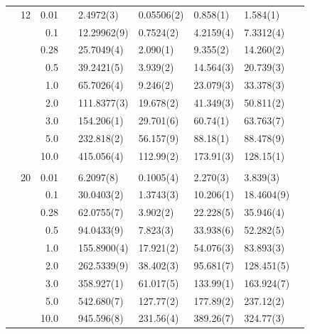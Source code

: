 \begin{table}[H]
\begin{tabularx}{\textwidth}{R{1cm}rrcR{2.3cm}R{2.3cm}R{2.3cm}R{2.3cm}R{1cm}}
		&12 & 0.01 && 2.4972(3) & 0.05506(2) & 0.858(1) & 1.584(1)\\
		&& 0.1 && 12.29962(9) & 0.7524(2) & 4.2159(4) & 7.3312(4) \\
		&& 0.28 && 25.7049(4) & 2.090(1) & 9.355(2) & 14.260(2) \\
		&& 0.5 && 39.2421(5) & 3.939(2) & 14.564(3) & 20.739(3) \\
		&& 1.0 && 65.7026(4) & 9.246(2) & 23.079(3) & 33.378(3) \\
		&& 2.0 && 111.8377(3) & 19.678(2) & 41.349(3) & 50.811(2) \\
		&& 3.0 && 154.206(1) & 29.701(6) & 60.74(1) & 63.763(7) \\ 
		&& 5.0 && 232.818(2) & 56.157(9) & 88.18(1) & 88.478(9) \\
		&& 10.0 && 415.056(4) & 112.99(2) & 173.91(3) & 128.15(1) \\
		\hdashline \\
		
		&20 & 0.01 && 6.2097(8) & 0.1005(4) & 2.270(3) & 3.839(3) \\
		&& 0.1 && 30.0403(2) & 1.3743(3) & 10.206(1) & 18.4604(9) \\
		&& 0.28 && 62.0755(7) & 3.902(2) & 22.228(5) & 35.946(4) \\
		&& 0.5 && 94.0433(9) & 7.823(3) & 33.938(6) & 52.282(5) \\
		&& 1.0 && 155.8900(4) & 17.921(2) & 54.076(3) & 83.893(3) \\
		&& 2.0 && 262.5339(9) & 38.402(3) & 95.681(7) & 128.451(5) \\
		&& 3.0 && 358.927(1) & 61.017(5) & 133.99(1) & 163.924(7) \\ 
		&& 5.0 && 542.680(7) & 127.77(2) & 177.89(2) & 237.12(2) \\
		&& 10.0 && 945.596(8) & 231.56(4) & 389.26(7) & 324.77(3) \\
		\hline \hline
	\end{tabularx}
\end{table} 

